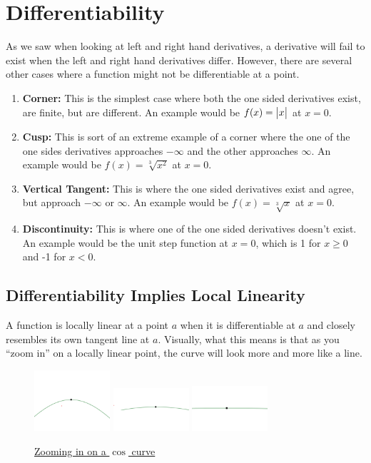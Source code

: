 \section{Differentiability}
As we saw when looking at left and right hand derivatives, a derivative will fail to exist when the left and right hand derivatives differ.
However, there are several other cases where a function might not be differentiable at a point.
\begin{enumerate}
	\item \textbf{Corner: } This is the simplest case where both the one sided derivatives exist, are finite, but are different.
		An example would be $f(x)=\big\lvert x \big\rvert$ at $x=0$.
	\item \textbf{Cusp: } This is sort of an extreme example of a corner where the one of the one sides derivatives approaches $-\infty$ and the other approaches $\infty$.
		An example would be $f(x)=\sqrt[3]{x^2}$ at $x=0$.
	\item \textbf{Vertical Tangent: } This is where the one sided derivatives exist and agree, but approach $-\infty$ or $\infty$.
		An example would be $f(x)=\sqrt[3]{x}$ at $x = 0$.
	\item \textbf{Discontinuity: } This is where one of the one sided derivatives doesn't exist.
		An example would be the unit step function at $x=0$, which is 1 for $x \geq 0$ and -1 for $x < 0$.
\end{enumerate}

\subsection{Differentiability Implies Local Linearity}
A function is locally linear at a point $a$ when it is differentiable at $a$ and closely resembles its own tangent line at $a$.
Visually, what this means is that as you ``zoom in'' on a locally linear point, the curve will look more and more like a line.

\begin{figure}[H]
	\label{locally_linear}
	\centering
	\includegraphics[width = 0.25\textwidth]{./derivatives/cos1.png}
	\includegraphics[width = 0.25\textwidth]{./derivatives/cos2.png}
	\includegraphics[width = 0.25\textwidth]{./derivatives/cos3.png}
	\caption{\hyperref{}{}{}{Zooming in on a $\cos$ curve}}
\end{figure}

